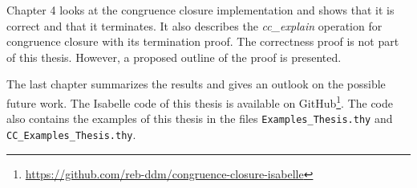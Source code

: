 Chapter 4 looks at the congruence closure implementation and shows that it is correct and that it terminates. It also describes the \emph{cc\_explain} operation for congruence closure with its termination proof. The correctness proof is not part of this thesis. However, a proposed outline of the proof is presented.

The last chapter summarizes the results and gives an outlook on the possible future work.
The Isabelle code of this thesis is available on GitHub\footnote{\url{https://github.com/reb-ddm/congruence-closure-isabelle}}.
The code also contains the examples of this thesis in the files \lstinline|Examples_Thesis.thy| and \lstinline|CC_Examples_Thesis.thy|.

